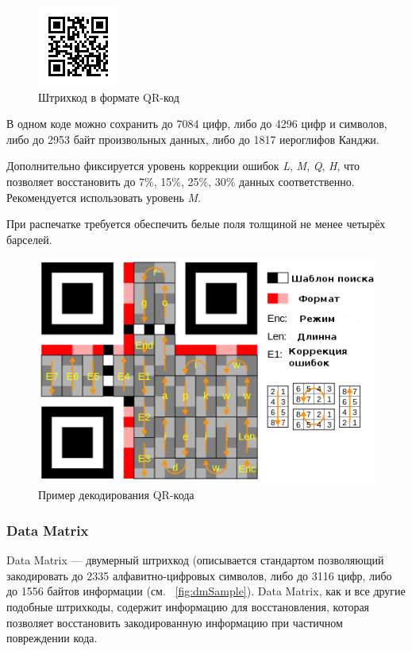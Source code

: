 \begin{figure}[h]
    \centering
    \includegraphics{img/qr_sample}
    \caption{Штрихкод в формате QR-код}
    \label{fig:qrSimple}
\end{figure}

В одном коде можно сохранить до 7084 цифр, либо до 4296 цифр и символов,
либо до 2953 байт произвольных данных, либо до 1817 иероглифов Канджи.

Дополнительно фиксируется уровень коррекции ошибок \textit{L}, 
\textit{M}, \textit{Q}, \textit{H}, что
позволяет восстановить до 7\%, 15\%, 25\%, 30\% данных соответственно.
Рекомендуется использовать уровень \textit{M}.

При распечатке требуется обеспечить белые поля толщиной не менее четырёх
барселей.

\begin{figure}[htb]
    \centering
    \includegraphics[scale=0.5]{img/qr_decode}
    \caption{Пример декодирования QR-кода}
    \label{fig:qrDecode}
\end{figure}


\subsubsection{Data Matrix}
Data Matrix --- двумерный штрихкод (описывается стандартом 
позволяющий 
закодировать до 2335 алфавитно-цифровых символов, либо до 3116 цифр, 
либо до 1556 байтов информации (см. \figurename\ \ref{fig:dmSample}). 
Data Matrix, как и все другие подобные 
штрихкоды, содержит информацию для восстановления, которая позволяет 
восстановить закодированную информацию при частичном повреждении кода.

